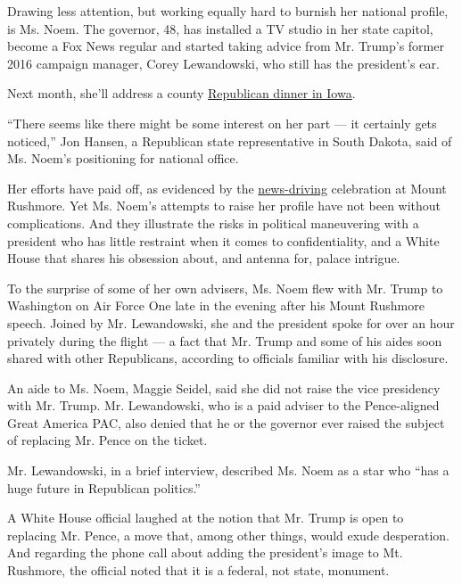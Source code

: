 Drawing less attention, but working equally hard to burnish her national
profile, is Ms. Noem. The governor, 48, has installed a TV studio in her
state capitol, become a Fox News regular and started taking advice from
Mr. Trump's former 2016 campaign manager, Corey Lewandowski, who still
has the president's ear.

Next month, she'll address a county
\href{https://nonpareilonline.com/news/local/govt-and-politics/south-dakota-governor-to-headline-pottawattamie-county-gop-dinner/article_4c86d770-2297-5129-8746-2b2e3ccf40a3.html}{Republican
dinner in Iowa}.

``There seems like there might be some interest on her part --- it
certainly gets noticed,'' Jon Hansen, a Republican state representative
in South Dakota, said of Ms. Noem's positioning for national office.

Her efforts have paid off, as evidenced by the
\href{https://www.nytimes.com/2020/07/03/us/politics/trump-coronavirus-mount-rushmore.html}{news-driving}
celebration at Mount Rushmore. Yet Ms. Noem's attempts to raise her
profile have not been without complications. And they illustrate the
risks in political maneuvering with a president who has little restraint
when it comes to confidentiality, and a White House that shares his
obsession about, and antenna for, palace intrigue.

To the surprise of some of her own advisers, Ms. Noem flew with Mr.
Trump to Washington on Air Force One late in the evening after his Mount
Rushmore speech. Joined by Mr. Lewandowski, she and the president spoke
for over an hour privately during the flight --- a fact that Mr. Trump
and some of his aides soon shared with other Republicans, according to
officials familiar with his disclosure.

An aide to Ms. Noem, Maggie Seidel, said she did not raise the vice
presidency with Mr. Trump. Mr. Lewandowski, who is a paid adviser to the
Pence-aligned Great America PAC, also denied that he or the governor
ever raised the subject of replacing Mr. Pence on the ticket.

Mr. Lewandowski, in a brief interview, described Ms. Noem as a star who
``has a huge future in Republican politics.''

A White House official laughed at the notion that Mr. Trump is open to
replacing Mr. Pence, a move that, among other things, would exude
desperation. And regarding the phone call about adding the president's
image to Mt. Rushmore, the official noted that it is a federal, not
state, monument.

